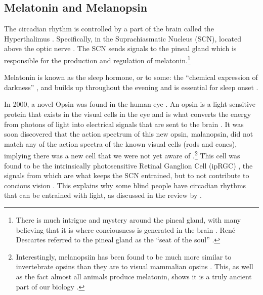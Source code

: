 \subsection{Melatonin and Melanopsin}

The circadian rhythm is controlled by a part of the brain called the Hyperthalimus \citep{stephanCircadianRhythmsDrinking1972}. Specifically, in the Suprachiasmatic Nucleus (SCN), located above the optic nerve \citep{welshIndividualNeuronsDissociated1995}. The SCN sends signals to the pineal gland \citep{cassoneMelatoninRoleVertebrate1998, borjiginPINEALGLANDMELATONIN1999} which is responsible for the production and regulation of melatonin.\footnote{
There is much intrigue and mystery around the pineal gland, with many believing that it is where conciousness is generated in the brain \citep{bobMelatoninConsciousnessTraumatic2008}. Ren\'e Descartes referred to the pineal gland as the ``seat of the soul'' \citep{lokhorstDescartesPinealGland2020}.
}

Melatonin is known as the sleep hormone, or to some: the ``chemical expression of darkness'' \citep{reiterMelatoninChemicalExpression1991}, and builds up throughout the evening and is essential for sleep onset \citep{arendtImportanceRelevanceMelatonin2003}.

In 2000, a novel Opsin was found in the human eye \citep{provencioNovelHumanOpsin2000}. An opsin is a light-sensitive protein that exists in the visual cells in the eye and is what converts the energy from photons of light into electrical signals that are sent to the brain \citep{terakitaOpsins2005}. It was soon discovered that the action spectrum of this new opsin, malanopsin, did not match any of the action spectra of the known visual cells (rods and cones), implying there was a new cell that we were not yet aware of \citep{thapanActionSpectrumMelatonin2001}.\footnote{
Interestingly, melanopsiin has been found to be much more similar to invertebrate opsins than they are to visual mammalian opsins \citep{provencioMelanopsinOpsinMelanophores1998}. This, as well as the fact almost all animals produce melatonin, shows it is a truly ancient part of our biology \citep{daviesEvolutionFunctionMelanopsin2014}.
} 
This cell was found to be the intrinsically photosensitive Retinal Ganglion Cell (ipRGC) \citep{bersonPhototransductionRetinalGanglion2002}, the signals from which are what keeps the SCN entrained, but to not contribute to concious vision \citep{bersonPhototransductionGanglioncellPhotoreceptors2007}. This explains why some blind people have circadian rhythms that can be entrained with light, as discussed in the review by \citet{allenCircadianRhythmsBlind2019}.

